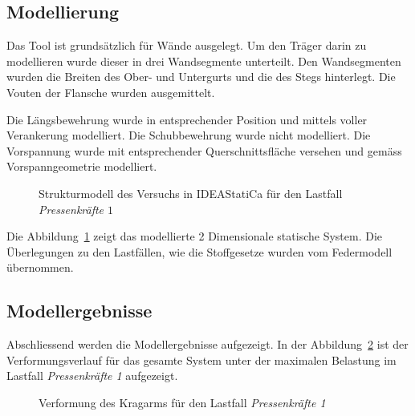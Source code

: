 \documentclass[
  11pt,
  letterpaper,
]{scrreprt}
\begin{document}
\subsection{Modellierung}\label{modellierung-3}

Das Tool ist grundsätzlich für Wände ausgelegt. Um den Träger darin zu
modellieren wurde dieser in drei Wandsegmente unterteilt. Den
Wandsegmenten wurden die Breiten des Ober- und Untergurts und die des
Stegs hinterlegt. Die Vouten der Flansche wurden ausgemittelt.

Die Längsbewehrung wurde in entsprechender Position und mittels voller
Verankerung modelliert. Die Schubbewehrung wurde nicht modelliert. Die
Vorspannung wurde mit entsprechender Querschnittsfläche versehen und
gemäss Vorspanngeometrie modelliert.

\begin{figure}[H]


\caption{\label{fig-system_ideastat}Strukturmodell des Versuchs in
IDEAStatiCa für den Lastfall \emph{Pressenkräfte \(1\)}}

\end{figure}%

Die Abbildung~\ref{fig-system_ideastat} zeigt das modellierte 2
Dimensionale statische System. Die Überlegungen zu den Lastfällen, wie
die Stoffgesetze wurden vom Federmodell übernommen.

\subsection{Modellergebnisse}\label{modellergebnisse-3}

Abschliessend werden die Modellergebnisse aufgezeigt. In der
Abbildung~\ref{fig-def_kragarm_ideastat} ist der Verformungsverlauf für
das gesamte System unter der maximalen Belastung im Lastfall
\emph{Pressenkräfte 1} aufgezeigt.

\begin{figure}[H]


\caption{\label{fig-def_kragarm_ideastat}Verformung des Kragarms für den
Lastfall \emph{Pressenkräfte 1}}

\end{figure}%
\end{document}
